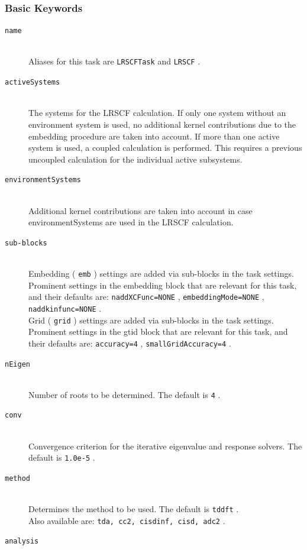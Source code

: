 \documentclass[bibliography=totocnumbered,a4paper,10pt,oneside]{scrbook}
\newcommand{\ttt}[1]{%
  \begingroup\setlength{\fboxsep}{1pt}%
  \colorbox{serenity-green!30}{\texttt{\hspace*{2pt}\vphantom{(g}#1\hspace*{2pt}}}%
  \endgroup
}
\begin{document}
\subsubsection{Basic Keywords}
\begin{description}
    \item [\texttt{name}]\hfill \\
    Aliases for this task are \ttt{LRSCFTask} and \ttt{LRSCF}.
    \item [\texttt{activeSystems}]\hfill \\
    The systems for the LRSCF calculation. If only one system without an environment system is used, no additional kernel contributions due to the embedding procedure are taken into account. If more than one active system is used, a coupled calculation is performed. This requires a previous uncoupled calculation for the individual active subsystems.
    \item [\texttt{environmentSystems}]\hfill \\
    Additional kernel contributions are taken into account in case environmentSystems are used in the LRSCF calculation.
    \item [\texttt{sub-blocks}]\hfill \\
    Embedding (\ttt{emb}) settings are added via sub-blocks in the task settings.
    Prominent settings in the embedding block that are relevant for this task, and their defaults are:
    \ttt{naddXCFunc=NONE}, \ttt{embeddingMode=NONE}, \ttt{naddkinfunc=NONE}.\\
    Grid (\ttt{grid}) settings are added via sub-blocks in the task settings.
    Prominent settings in the gtid block that are relevant for this task, and their defaults are:
    \ttt{accuracy=4}, \ttt{smallGridAccuracy=4}.
    \item [\texttt{nEigen}]\hfill \\
    Number of roots to be determined. The default is \ttt{4}.
    \item [\texttt{conv}]\hfill \\
    Convergence criterion for the iterative eigenvalue and response solvers. The default is \ttt{1.0e-5}.
    \item [\texttt{method}]\hfill \\
    Determines the method to be used. The default is \ttt{tddft}. \\ Also available are: \ttt{tda, cc2, cisdinf, cisd, adc2}.
    \item [\texttt{analysis}]\hfill \\

\end{description}
\end{document}
